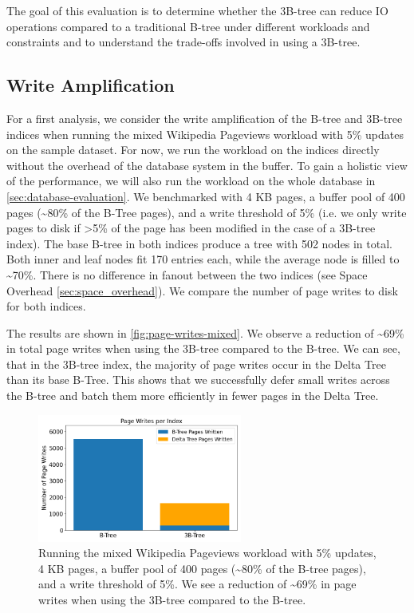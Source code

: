 The goal of this evaluation is to determine whether the 3B-tree can reduce \ac{IO} operations compared to a traditional B-tree under different workloads and constraints and to understand the trade-offs involved in using a 3B-tree.

\subsection{Write Amplification}
\label{sec:write-amplification}
For a first analysis, we consider the write amplification of the B-tree and 3B-tree indices when running the mixed Wikipedia Pageviews workload with 5\% updates on the sample dataset.
For now, we run the workload on the indices directly without the overhead of the database system in the buffer.
To gain a holistic view of the performance, we will also run the workload on the whole database in \autoref{sec:database-evaluation}.
We benchmarked with 4 KB pages, a buffer pool of 400 pages (\textasciitilde80\% of the B-Tree pages), and a write threshold of 5\% (i.e. we only write pages to disk if >5\% of the page has been modified in the case of a 3B-tree index).
The base B-tree in both indices produce a tree with 502 nodes in total.
Both inner and leaf nodes fit 170 entries each, while the average node is filled to \textasciitilde70\%.
There is no difference in fanout between the two indices (see Space Overhead \ref{sec:space_overhead}).
We compare the number of page writes to disk for both indices.

The results are shown in \autoref{fig:page-writes-mixed}.
We observe a reduction of \textasciitilde69\% in total page writes when using the 3B-tree compared to the B-tree.
We can see, that in the 3B-tree index, the majority of page writes occur in the Delta Tree than its base B-Tree.
This shows that we successfully defer small writes across the B-tree and batch them more efficiently in fewer pages in the Delta Tree.

\begin{figure}[htbp]
  \centering
  \includegraphics[width=0.6\textwidth]{figures/evaluation/pageviews_mixed_index.png}
  \caption{Running the mixed Wikipedia Pageviews workload with 5\% updates, 4 KB pages, a buffer pool of 400 pages (\textasciitilde80\% of the B-tree pages), and a write threshold of 5\%. We see a reduction of \textasciitilde69\% in page writes when using the 3B-tree compared to the B-tree.}
  \label{fig:page-writes-mixed}
\end{figure}

